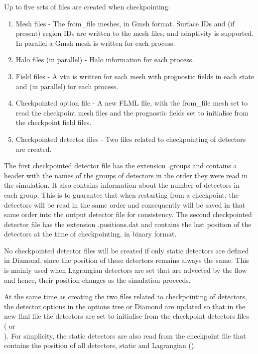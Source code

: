 Up to five sets of files are created when checkpointing:
\begin{enumerate}
\item Mesh files - The from\_file meshes, in Gmsh format. Surface IDs
  and (if present) region IDs are written to the mesh files, and adaptivity
  is supported. In parallel a Gmsh mesh is written for each process.
\item Halo files (in parallel) - Halo information for each process.
\item Field files - A vtu is written for each mesh with prognostic fields in
  each state and (in parallel) for each process.
\item Checkpointed option file - A new FLML file, with the from\_file mesh
  set to read the checkpoint mesh files and the prognostic fields set
  to initialise from the checkpoint field files.
\item Checkpointed detector files - Two files related to checkpointing of
  detectors are created.
\end{enumerate}

The first checkpointed detector file has the extension .groups and contains
a header with the names of the groups of detectors in the order they were
read in the simulation. It also contains information about the number of
detectors in each group. This is to guarantee that when restarting from a
checkpoint, the detectors will be read in the same order and consequently
will be saved in that same order into the output detector file for
consistency.  The second checkpointed detector file has the extension
.positions.dat and contains the last position of the detectors at the time
of checkpointing, in binary format.

No checkpointed detector files will be created if only static detectors are
defined in Diamond, since the position of these detectors remains always the
same. This is mainly used when Lagrangian detectors are set that are
advected by the flow and hence, their position changes as the simulation
proceeds.

At the same time as creating the two files related to checkpointing of
detectors, the detector options in the options tree or Diamond are updated
so that in the new flml file the detectors are set to initialise from the
checkpoint detectors files \\
( or \\
). For
simplicity, the static detectors are also read from the checkpoint file that
contains the position of all detectors, static and Lagrangian
().

